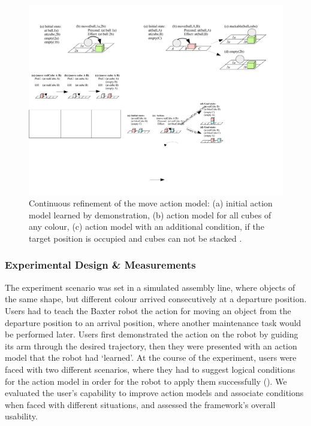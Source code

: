 \begin{figure}
	\centering
	\includegraphics[width=\linewidth]{Fig11.pdf}
	\caption{Continuous refinement of the move action model: (a) initial action model learned by demonstration, (b) action model for all cubes of any colour, (c) action model with an additional condition, if the target position is occupied and cubes can not be stacked \cite{liang2017b}.} 
	\label{fig:scenarios-exp2}
\end{figure} 

\subsubsection{Experimental Design \& Measurements}
The experiment scenario was set in a simulated assembly line, where objects of the same shape, but different colour arrived consecutively at a departure position.
Users had to teach the Baxter robot the action for moving an object from the departure position to an arrival position, where another maintenance task would be performed later.
Users first demonstrated the action on the robot by guiding its arm through the desired trajectory, then they were presented with an action model that the robot had `learned'.
At the course of the experiment, users were faced with two different scenarios, where they had to suggest logical conditions for the action model in order for the robot to apply them successfully ().
We evaluated the user's capability to improve action models and associate conditions when faced with different situations, and assessed the framework's overall usability.

